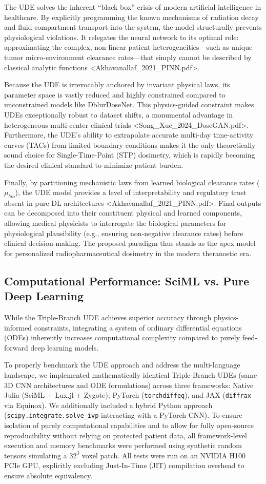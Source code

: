 \documentclass[10pt,letterpaper]{article}
\begin{document}
The UDE solves the inherent ``black box'' crisis of modern artificial intelligence in healthcare. By explicitly programming the known mechanisms of radiation decay and fluid compartment transport into the system, the model structurally prevents physiological violations. It relegates the neural network to its optimal role: approximating the complex, non-linear patient heterogeneities—such as unique tumor micro-environment clearance rates—that simply cannot be described by classical analytic functions <Akhavanallaf_2021_PINN.pdf>. 

Because the UDE is irrevocably anchored by invariant physical laws, its parameter space is vastly reduced and highly constrained compared to unconstrained models like DblurDoseNet. This physics-guided constraint makes UDEs exceptionally robust to dataset shifts, a monumental advantage in heterogeneous multi-center clinical trials <Song_Xue_2024_DoseGAN.pdf>. Furthermore, the UDE's ability to extrapolate accurate multi-day time-activity curves (TACs) from limited boundary conditions makes it the only theoretically sound choice for Single-Time-Point (STP) dosimetry, which is rapidly becoming the desired clinical standard to minimize patient burden. 

Finally, by partitioning mechanistic laws from learned biological clearance rates ($\mu_{bio}$), the UDE model provides a level of interpretability and regulatory trust absent in pure DL architectures <Akhavanallaf_2021_PINN.pdf>. Final outputs can be decomposed into their constituent physical and learned components, allowing medical physicists to interrogate the biological parameters for physiological plausibility (e.g., ensuring non-negative clearance rates) before clinical decision-making. The proposed paradigm thus stands as the apex model for personalized radiopharmaceutical dosimetry in the modern theranostic era.


\subsection{Computational Performance: SciML vs. Pure Deep Learning}
While the Triple-Branch UDE achieves superior accuracy through physics-informed constraints, integrating a system of ordinary differential equations (ODEs) inherently increases computational complexity compared to purely feed-forward deep learning models. 

To properly benchmark the UDE approach and address the multi-language landscape, we implemented mathematically identical Triple-Branch UDEs (same 3D CNN architectures and ODE formulations) across three frameworks: Native Julia (SciML + Lux.jl + Zygote), PyTorch (\texttt{torchdiffeq}), and JAX (\texttt{diffrax} via Equinox). We additionally included a hybrid Python approach (\texttt{scipy.integrate.solve\_ivp} interacting with a PyTorch CNN). To ensure isolation of purely computational capabilities and to allow for fully open-source reproducibility without relying on protected patient data, all framework-level execution and memory benchmarks were performed using synthetic random tensors simulating a $32^3$ voxel patch. All tests were run on an NVIDIA H100 PCIe GPU, explicitly excluding Just-In-Time (JIT) compilation overhead to ensure absolute equivalency.
\end{document}
